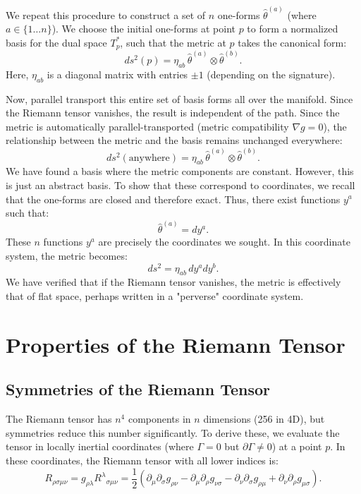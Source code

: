 \documentclass[11pt, a4paper]{report}
\begin{document}
We repeat this procedure to construct a set of $n$ one-forms $\hat{\theta}^{(a)}$ (where $a \in \{1 \dots n\}$). We choose the initial one-forms at point $p$ to form a normalized basis for the dual space $T^*_p$, such that the metric at $p$ takes the canonical form:
\begin{equation}
    ds^2(p) = \eta_{ab} \, \hat{\theta}^{(a)} \otimes \hat{\theta}^{(b)}.
\end{equation}
Here, $\eta_{ab}$ is a diagonal matrix with entries $\pm 1$ (depending on the signature).

Now, parallel transport this entire set of basis forms all over the manifold. Since the Riemann tensor vanishes, the result is independent of the path. Since the metric is automatically parallel-transported (metric compatibility $\nabla g = 0$), the relationship between the metric and the basis remains unchanged everywhere:
\begin{equation}
    ds^2(\text{anywhere}) = \eta_{ab} \, \hat{\theta}^{(a)} \otimes \hat{\theta}^{(b)}.
\end{equation}
We have found a basis where the metric components are constant. However, this is just an abstract basis. To show that these correspond to coordinates, we recall that the one-forms are closed and therefore exact. Thus, there exist functions $y^a$ such that:
\begin{equation}
    \hat{\theta}^{(a)} = dy^a.
\end{equation}
These $n$ functions $y^a$ are precisely the coordinates we sought. In this coordinate system, the metric becomes:
\begin{equation}
    ds^2 = \eta_{ab} \, dy^a dy^b.
\end{equation}
We have verified that if the Riemann tensor vanishes, the metric is effectively that of flat space, perhaps written in a "perverse" coordinate system.
\section{Properties of the Riemann Tensor}

\subsection*{Symmetries of the Riemann Tensor}
The Riemann tensor has \(n^4\) components in \(n\) dimensions (256 in 4D), but symmetries reduce this number significantly. To derive these, we evaluate the tensor in locally inertial coordinates (where \(\Gamma=0\) but \(\partial \Gamma \neq 0\)) at a point \(p\).
In these coordinates, the Riemann tensor with all lower indices is:
\begin{equation}
R_{\rho\sigma\mu\nu} = g_{\rho\lambda} {R^\lambda}_{\sigma\mu\nu} = \frac{1}{2} (\partial_\mu \partial_\sigma g_{\rho\nu} - \partial_\mu \partial_\rho g_{\nu\sigma} - \partial_\nu \partial_\sigma g_{\rho\mu} + \partial_\nu \partial_\rho g_{\mu\sigma}).
\end{equation}
\end{document}
